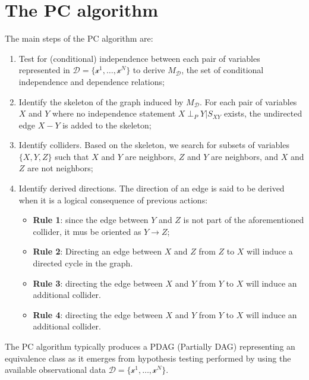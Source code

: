 \section{The PC algorithm}
The main steps of the PC algorithm are:
\begin{enumerate}
    \item Test for (conditional) independence between each pair of variables
          represented in $\mathcal{D} = \{\mathcal{x}^1, \dots, \mathcal{x}^N\}$
          to derive $M_\mathcal{D}$, the set of conditional independence and
          dependence relations;
    \item Identify the skeleton of the graph induced by $M_\mathcal{D}$. For each
          pair of variables $X$ and $Y$ where no independence statement $X \perp_{P} Y | S_{XY}$
          exists, the undirected edge $X - Y$ is added to the skeleton;
    \item Identify colliders. Based on the skeleton, we search for subsets of variables $\{X, Y, Z\}$
          such that $X$ and $Y$ are neighbors, $Z$ and $Y$ are neighbors, and
          $X$ and $Z$ are not neighbors;
    \item Identify derived directions. The direction of an edge is said to be
          derived when it is a logical consequence of previous actions:
          \begin{itemize}
              \item \textbf{Rule 1}: since the edge between $Y$ and $Z$ is not part
                    of the aforementioned collider, it mus be oriented as $Y \rightarrow Z$;
              \item \textbf{Rule 2}: Directing an edge between $X$ and $Z$ from $Z$
                    to $X$ will induce a directed cycle in the graph.
              \item \textbf{Rule 3}: directing the edge between $X$ and $Y$ from
                    $Y$ to $X$ will induce an additional collider.
              \item \textbf{Rule 4}: directing the edge between $X$ and $Y$ from
                    $Y$ to $X$ will induce an additional collider.
          \end{itemize}
\end{enumerate}

The PC algorithm typically produces a PDAG (Partially DAG) representing an equivalence
class as it emerges from hypothesis testing performed by using the available
observational data $\mathcal{D} = \{\mathcal{x}^1, \dots, \mathcal{x}^N\}$.

